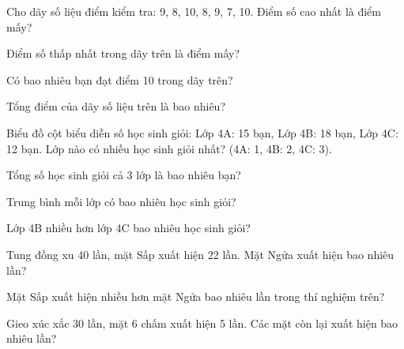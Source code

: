 \begin{ex}
Cho dãy số liệu điểm kiểm tra: 9, 8, 10, 8, 9, 7, 10. Điểm số cao nhất là điểm mấy?
\end{ex}

\begin{ex}
Điểm số thấp nhất trong dãy trên là điểm mấy?
\end{ex}

\begin{ex}
Có bao nhiêu bạn đạt điểm 10 trong dãy trên?
\end{ex}

\begin{ex}
Tổng điểm của dãy số liệu trên là bao nhiêu?
\end{ex}

\begin{ex}
Biểu đồ cột biểu diễn số học sinh giỏi: Lớp 4A: 15 bạn, Lớp 4B: 18 bạn, Lớp 4C: 12 bạn. Lớp nào có nhiều học sinh giỏi nhất? (4A: 1, 4B: 2, 4C: 3).
\end{ex}

\begin{ex}
Tổng số học sinh giỏi cả 3 lớp là bao nhiêu bạn?
\end{ex}

\begin{ex}
Trung bình mỗi lớp có bao nhiêu học sinh giỏi?
\end{ex}

\begin{ex}
Lớp 4B nhiều hơn lớp 4C bao nhiêu học sinh giỏi?
\end{ex}

\begin{ex}
Tung đồng xu 40 lần, mặt Sấp xuất hiện 22 lần. Mặt Ngửa xuất hiện bao nhiêu lần?
\end{ex}

\begin{ex}
Mặt Sấp xuất hiện nhiều hơn mặt Ngửa bao nhiêu lần trong thí nghiệm trên?
\end{ex}

\begin{ex}
Gieo xúc xắc 30 lần, mặt 6 chấm xuất hiện 5 lần. Các mặt còn lại xuất hiện bao nhiêu lần?
\end{ex}


